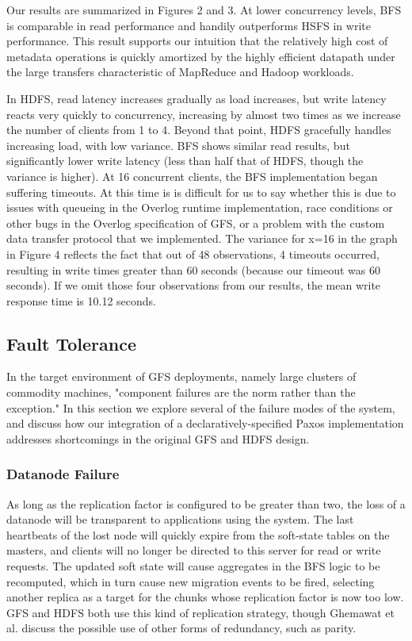 \documentclass{article}
\begin{document}
Our results are summarized in Figures 2 and 3.  At lower concurrency levels, BFS is comparable in read performance and handily outperforms HSFS in write performance.  This result supports our intuition that the relatively high cost of metadata operations is quickly amortized by the highly efficient datapath under the large transfers characteristic of MapReduce and Hadoop workloads.

In HDFS, read latency increases gradually as load increases, but write latency reacts very quickly to concurrency, increasing by almost two times as we increase the number of clients from 1 to 4.  Beyond that point, HDFS gracefully handles increasing load, with low variance.  BFS shows similar read results, but significantly lower write latency (less than half that of HDFS, though the variance is higher).  At 16 concurrent clients, the BFS implementation began suffering timeouts.  At this time is is difficult for us to say whether this is due to issues with queueing in the Overlog runtime implementation, race conditions or other bugs in the Overlog  specification of GFS, or a problem with the custom data transfer protocol that we implemented.  The variance for x=16 in the graph in Figure 4 reflects the fact that out of 48 observations, 4 timeouts occurred, resulting in write times greater than 60 seconds (because our timeout was 60 seconds).  If we omit those four observations from our results, the mean write response time is 10.12 seconds.

\subsection{Fault Tolerance}
In the target environment of GFS deployments, namely large clusters of commodity machines, "component failures are the norm rather than the exception."  In this section we explore several of the failure modes of the system, and discuss how our integration of a declaratively-specified Paxos implementation addresses shortcomings in the original GFS and HDFS design.

\subsubsection{Datanode Failure}
As long as the replication factor is configured to be greater than two, the loss of a datanode will be transparent to applications using the system.  The last heartbeats of the lost node will quickly expire from the soft-state tables on the masters, and clients will no longer be directed to this server for read or write requests.  The updated soft state will cause aggregates in the BFS logic to be recomputed, which in turn cause new migration events to be fired, selecting another replica as a target for the chunks whose replication factor is now too low.  GFS and HDFS both use this kind of replication strategy, though Ghemawat et al. discuss the possible use of other forms of redundancy, such as parity.
\end{document}
